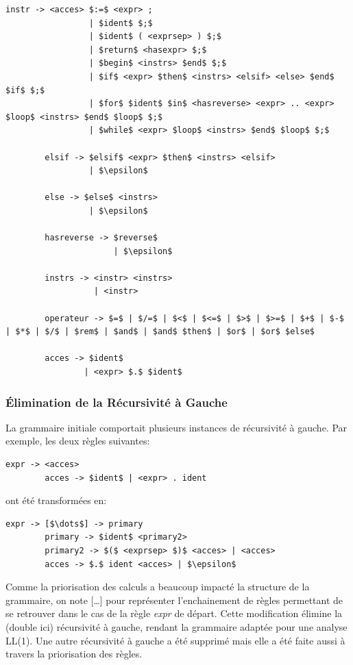 \documentclass[french,a4paper]{article}
\begin{document}
\begin{lstlisting}[keywordstyle=\color{black},label={lst:lstlisting}]
        instr -> <acces> $:=$ <expr> ;
                 | $ident$ $;$
                 | $ident$ ( <exprsep> ) $;$
                 | $return$ <hasexpr> $;$
                 | $begin$ <instrs> $end$ $;$
                 | $if$ <expr> $then$ <instrs> <elsif> <else> $end$ $if$ $;$
                 | $for$ $ident$ $in$ <hasreverse> <expr> .. <expr> $loop$ <instrs> $end$ $loop$ $;$
                 | $while$ <expr> $loop$ <instrs> $end$ $loop$ $;$

        elsif -> $elsif$ <expr> $then$ <instrs> <elsif>
                 | $\epsilon$

        else -> $else$ <instrs>
                 | $\epsilon$

        hasreverse -> $reverse$
                      | $\epsilon$

        instrs -> <instr> <instrs>
                  | <instr>

        operateur -> $=$ | $/=$ | $<$ | $<=$ | $>$ | $>=$ | $+$ | $-$ | $*$ | $/$ | $rem$ | $and$ | $and$ $then$ | $or$ | $or$ $else$

        acces -> $ident$
                | <expr> $.$ $ident$

    \end{lstlisting}

    \subsubsection{Élimination de la Récursivité à Gauche}
    La grammaire initiale comportait plusieurs instances de récursivité à gauche.
    Par exemple, les deux règles suivantes:
    \begin{lstlisting}[label={lst:lstlisting2}]
        expr -> <acces>
        acces -> $ident$ | <expr> . ident
    \end{lstlisting}
    ont été transformées en:
    \begin{lstlisting}[label={lst:lstlisting3}]
        expr -> [$\dots$] -> primary
        primary -> $ident$ <primary2>
        primary2 -> $($ <exprsep> $)$ <acces> | <acces>
        acces -> $.$ ident <acces> | $\epsilon$
    \end{lstlisting}
    Comme la priorisation des calculs a beaucoup impacté la structure de la grammaire, on note [\dots] pour représenter l'enchainement de règles permettant de se retrouver dans le cas de la règle \textit{expr} de départ.
    Cette modification élimine la (double ici) récursivité à gauche, rendant la grammaire adaptée pour une analyse LL(1).
    Une autre récursivité à gauche a été supprimé mais elle a été faite aussi à travers la priorisation des règles.
\end{document}
